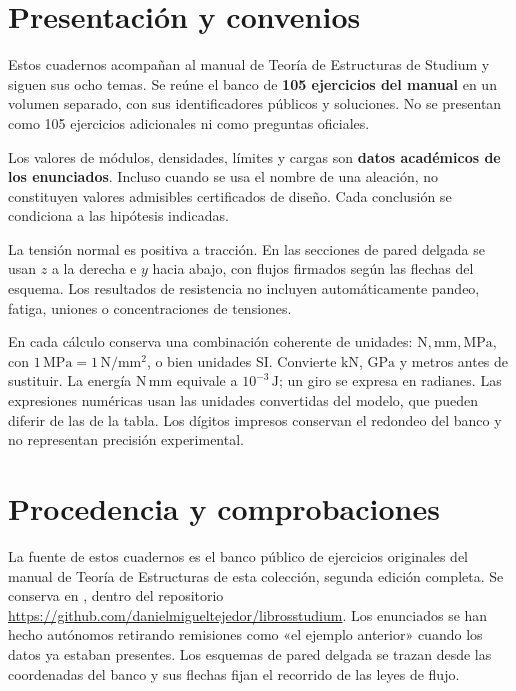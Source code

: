 \documentclass[10pt,a4paper,openany]{book}
\begin{document}
\frontmatter
\studiumreadingguide
\chapter*{Presentación y convenios}
Estos cuadernos acompañan al manual de Teoría de Estructuras de Studium y siguen sus ocho temas. Se reúne el banco de \textbf{105 ejercicios del manual} en un volumen separado, con sus identificadores públicos y soluciones. No se presentan como 105 ejercicios adicionales ni como preguntas oficiales.

Los valores de módulos, densidades, límites y cargas son \textbf{datos académicos de los enunciados}. Incluso cuando se usa el nombre de una aleación, no constituyen valores admisibles certificados de diseño. Cada conclusión se condiciona a las hipótesis indicadas.

La tensión normal es positiva a tracción. En las secciones de pared delgada se usan $z$ a la derecha e $y$ hacia abajo, con flujos firmados según las flechas del esquema. Los resultados de resistencia no incluyen automáticamente pandeo, fatiga, uniones o concentraciones de tensiones.

En cada cálculo conserva una combinación coherente de unidades: $\mathrm{N,mm,MPa}$, con $1\,\mathrm{MPa}=1\,\mathrm{N/mm^2}$, o bien unidades SI. Convierte $\mathrm{kN}$, $\mathrm{GPa}$ y metros antes de sustituir. La energía $\mathrm{N\,mm}$ equivale a $10^{-3}\,\mathrm{J}$; un giro se expresa en radianes. Las expresiones numéricas usan las unidades convertidas del modelo, que pueden diferir de las de la tabla. Los dígitos impresos conservan el redondeo del banco y no representan precisión experimental.
\tableofcontents\mainmatter
\backmatter
\chapter*{Procedencia y comprobaciones}
La fuente de estos cuadernos es el banco público de ejercicios originales del manual de Teoría de Estructuras de esta colección, segunda edición completa. Se conserva en , dentro del repositorio \url{https://github.com/danielmigueltejedor/librosstudium}. Los enunciados se han hecho autónomos retirando remisiones como «el ejemplo anterior» cuando los datos ya estaban presentes. Los esquemas de pared delgada se trazan desde las coordenadas del banco y sus flechas fijan el recorrido de las leyes de flujo.
\end{document}
